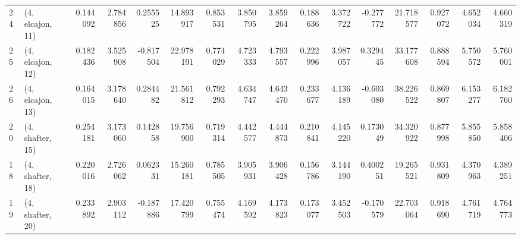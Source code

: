 \begin{tabular}{llrrrrrrrrrrrrrr}
24 &  (4, elcajon, 11) &   0.144092 &  2.784856 &  0.255525 &  14.893917 &  0.853531 &   3.850795 &  3.859264 &  0.188636 &  3.372722 & -0.277772 &   21.718577 &  0.927072 &   4.652034 &   4.660319 \\
25 &  (4, elcajon, 12) &   0.182436 &  3.525908 & -0.817504 &  22.978191 &  0.774029 &   4.723333 &  4.793557 &  0.222996 &  3.987057 &  0.329445 &   33.177608 &  0.888594 &   5.750572 &   5.760001 \\
26 &  (4, elcajon, 13) &   0.164015 &  3.178640 &  0.284482 &  21.561812 &  0.792293 &   4.634747 &  4.643470 &  0.233677 &  4.136189 & -0.603080 &   38.226522 &  0.869807 &   6.153277 &   6.182760 \\
20 &  (4, shafter, 15) &   0.254181 &  3.173060 &  0.142858 &  19.756900 &  0.719314 &   4.442577 &  4.444873 &  0.210841 &  4.145220 &  0.173049 &   34.320922 &  0.877998 &   5.855850 &   5.858406 \\
18 &  (4, shafter, 18) &   0.220016 &  2.726062 &  0.062331 &  15.260181 &  0.785505 &   3.905931 &  3.906428 &  0.156786 &  3.144190 &  0.400251 &   19.265521 &  0.931809 &   4.370963 &   4.389251 \\
19 &  (4, shafter, 20) &   0.233892 &  2.903112 & -0.187886 &  17.420799 &  0.755474 &   4.169592 &  4.173823 &  0.173077 &  3.452503 & -0.170579 &   22.703064 &  0.918690 &   4.761719 &   4.764773 \\
\bottomrule
\end{tabular}
